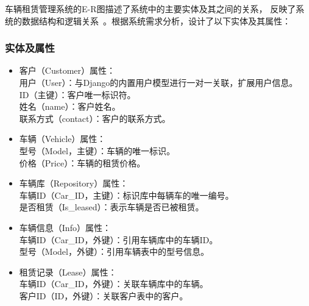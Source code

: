 \documentclass[UTF8,a4paper,12pt]{ctexart}
\begin{document}
车辆租赁管理系统的E-R图描述了系统中的主要实体及其之间的关系，
反映了系统的数据结构和逻辑关系~\cite{silberschatz2011database}。根据系统需求分析，设计了以下实体及其属性：

\subsubsection{实体及属性}

\begin{itemize}[leftmargin=0.3cm]
    \item 客户（Customer）属性：\\
    用户（User）：与Django的内置用户模型进行一对一关联，扩展用户信息。\\
    ID（主键）：客户唯一标识符。\\
    姓名（name）：客户姓名。\\
    联系方式（contact）：客户的联系方式。\\
\vspace{-0.7cm}
    \item 车辆（Vehicle）属性：\\
    型号（Model，主键）：车辆的唯一标识。\\
    价格（Price）：车辆的租赁价格。\\

    \item 车辆库（Repository）属性：\\
    车辆ID（Car\_ID，主键）：标识库中每辆车的唯一编号。\\
    是否租赁（Is\_leased）：表示车辆是否已被租赁。\\
\vspace{-0.7cm}
    \item 车辆信息（Info）属性：\\
    车辆ID（Car\_ID，外键）：引用车辆库中的车辆ID。\\
    型号（Model，外键）：引用车辆表中的型号信息。\\
\vspace{-0.7cm}    
    \item 租赁记录（Lease）属性：\\
    车辆ID（Car\_ID，外键）：关联车辆库中的车辆。\\
    客户ID（ID，外键）：关联客户表中的客户。\\
\end{itemize}
\end{document}

